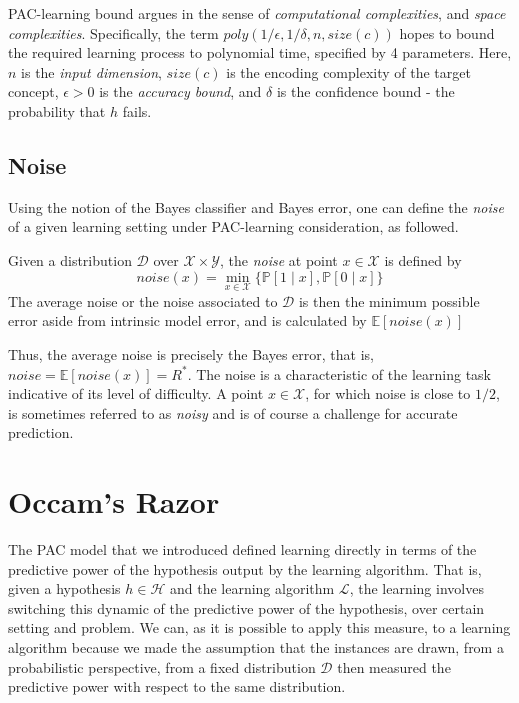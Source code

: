 PAC-learning bound argues in the sense of \textit{computational complexities}, and \textit{space complexities}. Specifically, the term $poly(1/\epsilon,1/\delta,n,size(c))$ hopes to bound the required learning process to polynomial time, specified by 4 parameters. Here, $n$ is the \textit{input dimension}, $size(c)$ is the encoding complexity of the target concept, $\epsilon>0$ is the \textit{accuracy bound}, and $\delta$ is the confidence bound - the probability that $h$ fails.

\subsection{Noise}

Using the notion of the Bayes classifier and Bayes error, one can define the \textit{noise}  of a given learning setting under PAC-learning consideration, as followed. 
\begin{definition}[Noise]
    Given a distribution $\mathcal{D}$ over $\mathcal{X}\times \mathcal{Y}$, the \textit{noise} at point $x\in \mathcal{X}$ is defined by \begin{equation*}
        noise(x) = \min_{x\in \mathcal{X}} \{\mathbb{P}[1\mid x], \mathbb{P}[0\mid x]\}
    \end{equation*}
    The average noise or the noise associated to $\mathcal{D}$ is then the minimum possible error aside from intrinsic model error, and is calculated by $\mathbb{E}[noise(x)]$
\end{definition}
Thus, the average noise is precisely the Bayes error, that is, $noise = \mathbb{E}[noise(x)]=R^{*}$. The noise is a characteristic of the learning task indicative of its level of difficulty. A point $x\in \mathcal{X}$, for which noise is close to $1/2$, is sometimes referred to as \textit{noisy} and is of course a challenge for accurate prediction. 

\section{Occam's Razor}

The PAC model that we introduced defined learning directly in terms of the predictive power of the hypothesis output by the learning algorithm. That is, given a hypothesis $h\in \mathcal{H}$ and the learning algorithm $\mathcal{L}$, the learning involves switching this dynamic of the predictive power of the hypothesis, over certain setting and problem. We can, as it is possible to apply this measure, to a learning algorithm because we made the assumption that the instances are drawn, from a probabilistic perspective, from a fixed distribution $\mathcal{D}$ then measured the predictive power with respect to the same distribution. 

